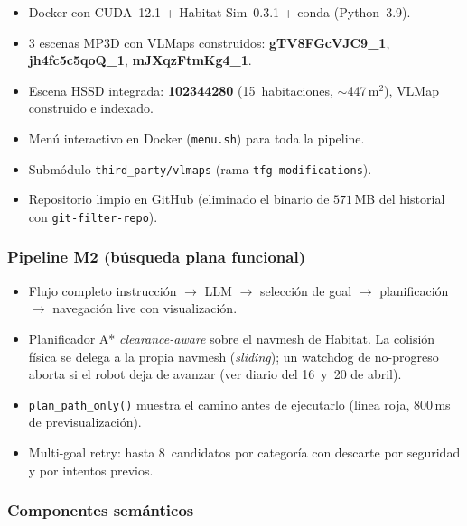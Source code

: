 \documentclass[11pt,a4paper]{article}
\begin{document}
\begin{itemize}
  \item[\checkmark] Docker con CUDA~12.1 + Habitat-Sim~0.3.1 + conda
        (Python~3.9).
  \item[\checkmark] 3 escenas MP3D con VLMaps construidos:
        \textbf{gTV8FGcVJC9\_1}, \textbf{jh4fc5c5qoQ\_1},
        \textbf{mJXqzFtmKg4\_1}.
  \item[\checkmark] Escena HSSD integrada: \textbf{102344280}
        (15~habitaciones, $\sim$447\,m$^2$), VLMap construido e indexado.
  \item[\checkmark] Menú interactivo en Docker (\texttt{menu.sh}) para toda la
        pipeline.
  \item[\checkmark] Submódulo \texttt{third\_party/vlmaps} (rama
        \texttt{tfg-modifications}).
  \item[\checkmark] Repositorio limpio en GitHub (eliminado el binario de
        $571$\,MB del historial con \texttt{git-filter-repo}).
\end{itemize}

\subsubsection*{Pipeline M2 (búsqueda plana funcional)}

\begin{itemize}
  \item[\checkmark] Flujo completo instrucción $\rightarrow$ LLM $\rightarrow$
        selección de goal $\rightarrow$ planificación $\rightarrow$ navegación
        live con visualización.
  \item[\checkmark] Planificador A* \emph{clearance-aware} sobre el navmesh
        de Habitat. La colisión física se delega a la propia navmesh
        (\textit{sliding}); un watchdog de no-progreso aborta si el robot
        deja de avanzar (ver diario del 16~y~20 de abril).
  \item[\checkmark] \texttt{plan\_path\_only()} muestra el camino antes de
        ejecutarlo (línea roja, $800$\,ms de previsualización).
  \item[\checkmark] Multi-goal retry: hasta 8~candidatos por categoría con
        descarte por seguridad y por intentos previos.
\end{itemize}

\subsubsection*{Componentes semánticos}
\end{document}

